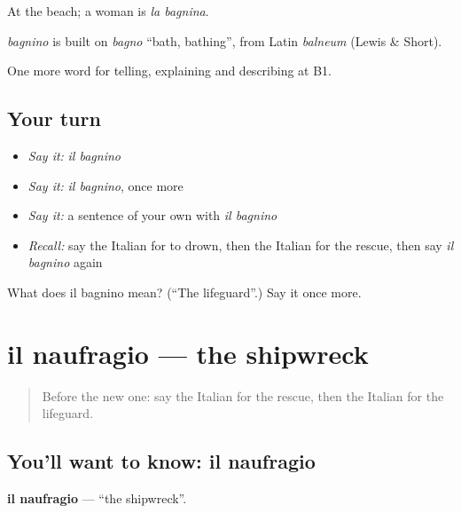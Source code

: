 At the beach; a woman is \emph{la bagnina}.

\begin{cousinweb}
\emph{bagnino} is built on \emph{bagno} \textquotedblleft{}bath, bathing\textquotedblright{}, from Latin \emph{balneum} (Lewis \& Short).
\end{cousinweb}

\begin{grammarlens}[title={What you've built}]
One more word for telling, explaining and describing at B1.
\end{grammarlens}

\subsection*{Your turn}
\begin{itemize}
\raggedright
  \item \emph{Say it:} \emph{il bagnino}
  \item \emph{Say it:} \emph{il bagnino}, once more
  \item \emph{Say it:} a sentence of your own with \emph{il bagnino}
  \item \emph{Recall:} say the Italian for to drown, then the Italian for the rescue, then say \emph{il bagnino} again
\end{itemize}

\begin{tcolorbox}[breakable,colback=teal!4,colframe=teal!35!black,title={Before you move on}]
What does il bagnino mean? (\textquotedblleft{}The lifeguard\textquotedblright{}.) Say it once more.
\end{tcolorbox}
\section[il naufragio]{il naufragio — the shipwreck}

\label{lesson:IT-C306-naufragio}



\begin{quote}
Before the new one: say the Italian for the rescue, then the Italian for the lifeguard.
\end{quote}

\subsection*{You'll want to know: il naufragio}
\textbf{il naufragio} — \textquotedblleft{}the shipwreck\textquotedblright{}.

